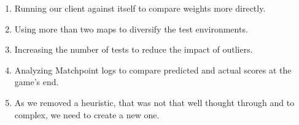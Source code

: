 \begin{enumerate}
    \item Running our client against itself to compare weights more directly.
    \item Using more than two maps to diversify the test environments.
    \item Increasing the number of tests to reduce the impact of outliers.
    \item Analyzing Matchpoint logs to compare predicted and actual scores at the game's end.
    \item As we removed a heuristic, that was not that well thought through and to complex, we need to create a new one.
\end{enumerate}
